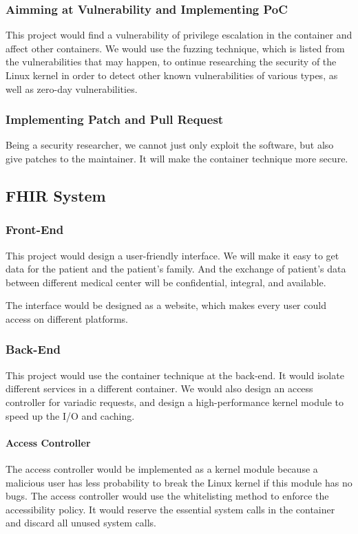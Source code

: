 \documentclass[12pt,a4paper]{article}
\begin{document}
\subsubsection{Aimming at Vulnerability and Implementing PoC}
This project would find a vulnerability of privilege escalation in the container and affect
other containers. We would use the fuzzing technique, which is listed from the vulnerabilities
that may happen, to ontinue researching the security of the Linux kernel in order to detect
other known vulnerabilities of various types, as well as zero-day vulnerabilities. \cite{Fuzzing}

\subsubsection{Implementing Patch and Pull Request}
Being a security researcher, we cannot just only exploit the software, but also give patches to
the maintainer. It will make the container technique more secure.

\subsection{FHIR System}
\subsubsection{Front-End}
This project would design a user-friendly interface. We will make it easy to get data for the
patient and the patient's family. And the exchange of patient's data between different
medical center will be confidential, integral, and available.

The interface would be designed as a website, which makes every user could access on different
platforms.

\subsubsection{Back-End}
This project would use the container technique at the back-end. It would isolate different
services in a different container. We would also design an access controller for variadic
requests, and design a high-performance kernel module to speed up the I/O and caching.

\paragraph{Access Controller}
The access controller would be implemented as a kernel module because a malicious user has
less probability to break the Linux kernel if this module has no bugs.
The access controller would use the whitelisting method to enforce the accessibility policy.
\cite{Access_Control_Architecture}
It would reserve the essential system calls in the container and discard all unused system calls.
\end{document}
